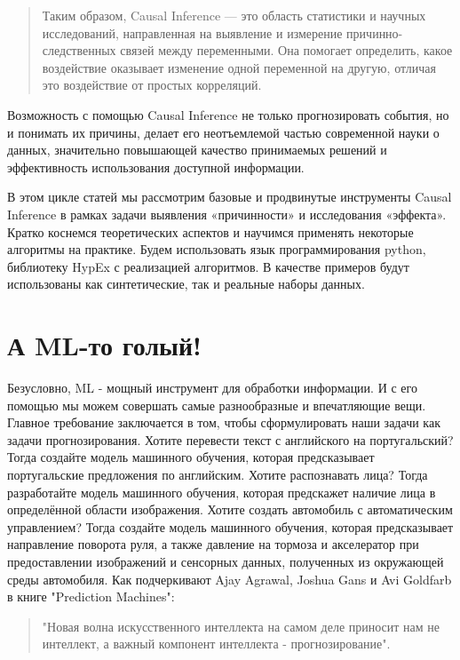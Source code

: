\documentclass{article}
\begin{document}
        \begin{quote}
           Таким образом, Causal Inference — это область статистики и научных исследований, направленная на выявление и измерение причинно-следственных связей между переменными.
           Она помогает определить, какое воздействие оказывает изменение одной переменной на другую, отличая это воздействие от простых корреляций.
        \end{quote}

        Возможность с помощью Causal Inference не только прогнозировать события, но и понимать их причины, делает его неотъемлемой частью современной науки о данных, значительно повышающей качество принимаемых решений и эффективность использования доступной информации.

        В этом цикле статей мы рассмотрим базовые и продвинутые инструменты Causal Inference в рамках задачи выявления «причинности» и исследования «эффекта».
        Кратко коснемся теоретических аспектов и научимся применять некоторые алгоритмы на практике.
        Будем использовать язык программирования python, библиотеку HypEx с реализацией алгоритмов.
        В качестве примеров будут использованы как синтетические, так и реальные наборы данных.
    \section*{А ML-то голый!}
        Безусловно, ML - мощный инструмент для обработки информации.
        И с его помощью мы можем совершать самые разнообразные и впечатляющие вещи.
        Главное требование заключается в том, чтобы сформулировать наши задачи как задачи прогнозирования.
        Хотите перевести текст с английского на португальский?
        Тогда создайте модель машинного обучения, которая предсказывает португальские предложения по английским.
        Хотите распознавать лица?
        Тогда разработайте модель машинного обучения, которая предскажет наличие лица в определённой области изображения.
        Хотите создать автомобиль с автоматическим управлением?
        Тогда создайте модель машинного обучения, которая предсказывает направление поворота руля, а также давление на тормоза и акселератор при предоставлении изображений и сенсорных данных, полученных из окружающей среды автомобиля.
        Как подчеркивают Ajay Agrawal, Joshua Gans и Avi Goldfarb в книге "Prediction Machines":
        \begin{quote}
            "Новая волна искусственного интеллекта на самом деле приносит нам не интеллект, а важный компонент интеллекта - прогнозирование".
        \end{quote}
\end{document}
